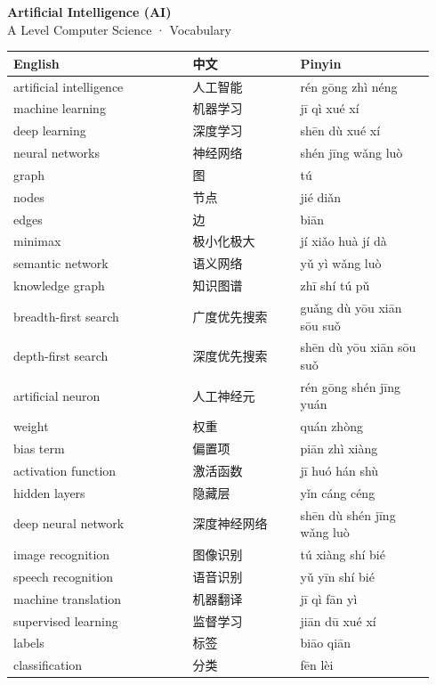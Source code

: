 \documentclass[11pt]{article}
\begin{document}
\begin{center}
  {\LARGE\bfseries Artificial Intelligence (AI)}\\[0.35em]
  {\large A Level Computer Science · Vocabulary}
\end{center}
\vspace{0.6em}

\begin{longtable}{@{}p{0.40\linewidth}p{0.24\linewidth}p{0.30\linewidth}@{}}
\toprule
\textbf{English} & \textbf{中文} & \textbf{Pinyin} \\
\midrule
\endhead
\bottomrule
\endlastfoot
artificial intelligence & 人工智能 & rén gōng zhì néng \\
machine learning & 机器学习 & jī qì xué xí \\
deep learning & 深度学习 & shēn dù xué xí \\
neural networks & 神经网络 & shén jīng wǎng luò \\
graph & 图 & tú \\
nodes & 节点 & jié diǎn \\
edges & 边 & biān \\
minimax & 极小化极大 & jí xiǎo huà jí dà \\
semantic network & 语义网络 & yǔ yì wǎng luò \\
knowledge graph & 知识图谱 & zhī shí tú pǔ \\
breadth-first search & 广度优先搜索 & guǎng dù yōu xiān sōu suǒ \\
depth-first search & 深度优先搜索 & shēn dù yōu xiān sōu suǒ \\
artificial neuron & 人工神经元 & rén gōng shén jīng yuán \\
weight & 权重 & quán zhòng \\
bias term & 偏置项 & piān zhì xiàng \\
activation function & 激活函数 & jī huó hán shù \\
hidden layers & 隐藏层 & yǐn cáng céng \\
deep neural network & 深度神经网络 & shēn dù shén jīng wǎng luò \\
image recognition & 图像识别 & tú xiàng shí bié \\
speech recognition & 语音识别 & yǔ yīn shí bié \\
machine translation & 机器翻译 & jī qì fān yì \\
supervised learning & 监督学习 & jiān dū xué xí \\
labels & 标签 & biāo qiān \\
classification & 分类 & fēn lèi \\

\end{longtable}
\end{document}
